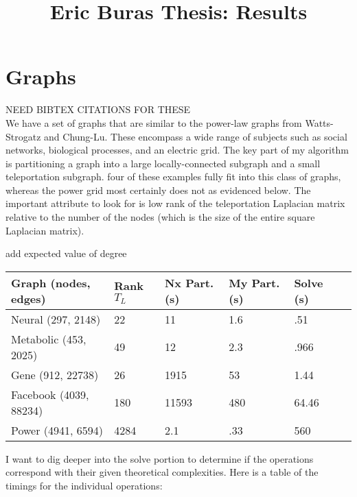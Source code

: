 \documentclass{article}
\begin{document}
\title{Eric Buras Thesis: Results}

\maketitle

\section{Graphs}
NEED BIBTEX CITATIONS FOR THESE\\
We have a set of graphs that are similar to the power-law graphs from Watts-Strogatz and Chung-Lu. These encompass a wide range of subjects such as social networks, biological processes, and an electric grid. The key part of my algorithm is partitioning a graph into a large locally-connected subgraph and a small teleportation subgraph. four of these examples fully fit into this class of graphs, whereas the power grid most certainly does not as evidenced below. The important attribute to look for is low rank of the teleportation Laplacian matrix relative to the number of the nodes (which is the size of the entire square Laplacian matrix).

add expected value of degree \\
\begin{center}
\renewcommand{\arraystretch}{1.5}
    \begin{tabular}{ | l | l | l | l | l | l |}
    \hline
    Graph (nodes, edges) & Rank $T_L$ & Nx Part. (s) & My Part. (s) & Solve (s) \\ \hline
    Neural (297, 2148) & 22 & 11 & 1.6 & .51 \\ \hline
    Metabolic (453, 2025) & 49 & 12 & 2.3 & .966 \\  \hline
    Gene (912, 22738) & 26 & 1915 & 53 & 1.44 \\ \hline
    Facebook (4039, 88234) & 180 & 11593 & 480 & 64.46 \\ \hline
    Power (4941, 6594) & 4284 & 2.1 & .33 & 560 \\ 
    \hline
    \end{tabular}
\end{center}
I want to dig deeper into the solve portion to determine if the operations correspond with their given theoretical complexities. Here is a table of the timings for the individual operations:\\
\end{document}
